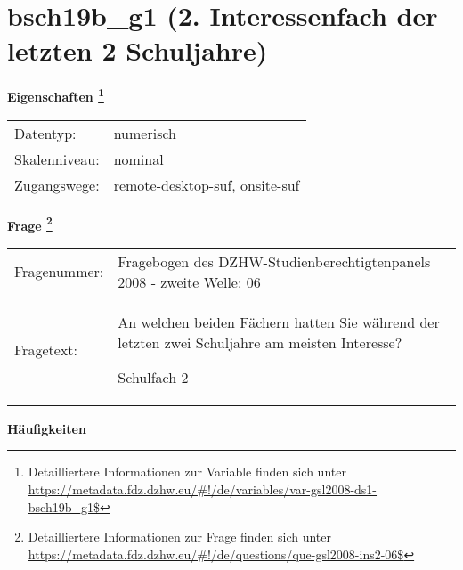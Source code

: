 
    \setcounter{footnote}{0}

    \vspace*{-1.8cm}
	\section{bsch19b\_g1 (2. Interessenfach der letzten 2 Schuljahre)}
	\label{section:bsch19b_g1}



    \vspace*{0.5cm}
    \noindent\textbf{Eigenschaften
	\footnote{Detailliertere Informationen zur Variable finden sich unter
		\url{https://metadata.fdz.dzhw.eu/\#!/de/variables/var-gsl2008-ds1-bsch19b_g1$}}}\\
	\begin{tabularx}{\hsize}{@{}lX}
	Datentyp: & numerisch \\
	Skalenniveau: & nominal \\
	Zugangswege: &
	  remote-desktop-suf, 
	  onsite-suf
 \\
    \end{tabularx}



				\vspace*{0.5cm}
                \noindent\textbf{Frage
	                \footnote{Detailliertere Informationen zur Frage finden sich unter
		              \url{https://metadata.fdz.dzhw.eu/\#!/de/questions/que-gsl2008-ins2-06$}}}\\
				\begin{tabularx}{\hsize}{@{}lX}
					Fragenummer: &
					  Fragebogen des DZHW-Studienberechtigtenpanels 2008 - zweite Welle:
					  06
 \\
					Fragetext: & An welchen beiden Fächern hatten Sie während der letzten zwei Schuljahre am meisten Interesse?\par  Schulfach 2 \\
				\end{tabularx}





        		\vspace*{0.5cm}
                \noindent\textbf{Häufigkeiten}

